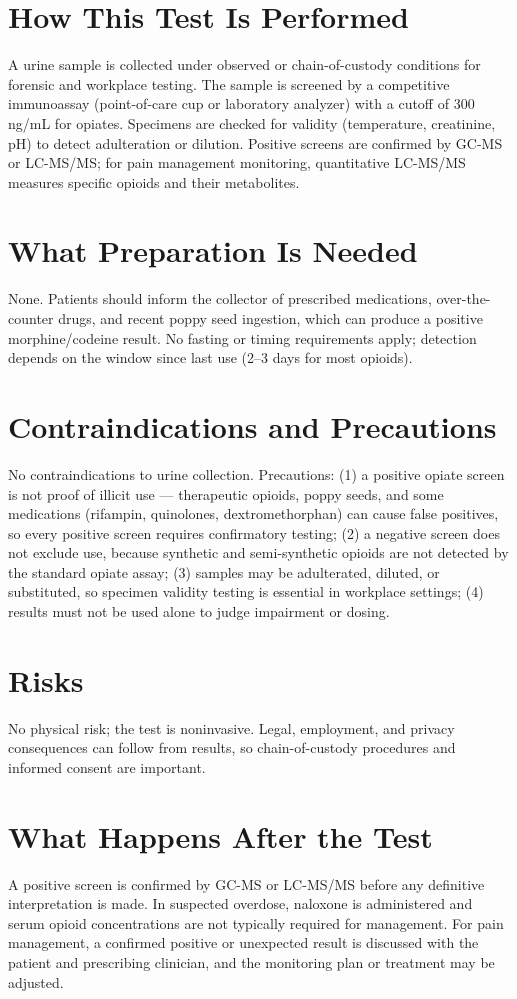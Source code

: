 \section*{How This Test Is Performed}
A urine sample is collected under observed or chain-of-custody conditions for forensic and workplace testing. The sample is screened by a competitive immunoassay (point-of-care cup or laboratory analyzer) with a cutoff of 300 ng/mL for opiates. Specimens are checked for validity (temperature, creatinine, pH) to detect adulteration or dilution. Positive screens are confirmed by GC-MS or LC-MS/MS; for pain management monitoring, quantitative LC-MS/MS measures specific opioids and their metabolites.
\section*{What Preparation Is Needed}
None. Patients should inform the collector of prescribed medications, over-the-counter drugs, and recent poppy seed ingestion, which can produce a positive morphine/codeine result. No fasting or timing requirements apply; detection depends on the window since last use (2--3 days for most opioids).
\section*{Contraindications and Precautions}
No contraindications to urine collection. Precautions: (1) a positive opiate screen is not proof of illicit use --- therapeutic opioids, poppy seeds, and some medications (rifampin, quinolones, dextromethorphan) can cause false positives, so every positive screen requires confirmatory testing; (2) a negative screen does not exclude use, because synthetic and semi-synthetic opioids are not detected by the standard opiate assay; (3) samples may be adulterated, diluted, or substituted, so specimen validity testing is essential in workplace settings; (4) results must not be used alone to judge impairment or dosing.
\section*{Risks}
No physical risk; the test is noninvasive. Legal, employment, and privacy consequences can follow from results, so chain-of-custody procedures and informed consent are important.
\section*{What Happens After the Test}
A positive screen is confirmed by GC-MS or LC-MS/MS before any definitive interpretation is made. In suspected overdose, naloxone is administered and serum opioid concentrations are not typically required for management. For pain management, a confirmed positive or unexpected result is discussed with the patient and prescribing clinician, and the monitoring plan or treatment may be adjusted.
